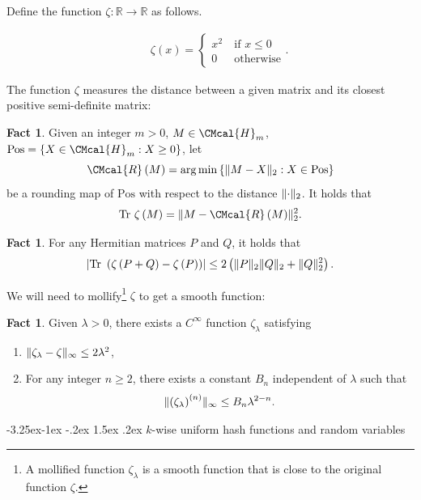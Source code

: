 \documentclass[10pt,a4paper]{article}
\makeatletter
\renewcommand{\subsection}{\@startsection{subsection}{2}{\z@}%
             {-3.25ex\@plus -1ex \@minus -.2ex}%
             {1.5ex \@plus .2ex}%
             {\normalfont\large\scshape\bfseries}}
\def\H{\CMcal{H}}
\def\R{\CMcal{R}}
\theoremstyle{plain}
\theoremstyle{definition}
\newtheorem{fact}[theorem]{Fact}
\newcommand{\reals}{{\mathbb R}}
\newcommand {\set} [1] {\ensuremath{ \left\lbrace #1 \right\rbrace }}
\newcommand {\br} [1] {\ensuremath{ \left( #1 \right) }}
\DeclarePairedDelimiter{\norm}{\lVert}{\rVert}
\newcommand {\normsub} [2] {\ensuremath{ \norm{#1}_{#2} }}
\newcommand {\twonorm} [1] {\normsub{#1}{2}}
\DeclarePairedDelimiter{\abs}{\lvert}{\rvert}
\newcommand {\Tr} {\ensuremath{ \mathrm{Tr} }}
\newcommand{\1}{\mathbb{1}} %
\makeatother
\begin{document}
Define the function $\zeta:\reals\rightarrow\reals$ as follows.

\begin{eqnarray}
	&&\zeta\br{x}=\begin{cases}x^2~&\mbox{if $x\leq 0$}\\ 0~&\mbox{otherwise}\end{cases}.\label{eqn:zeta}
\end{eqnarray}

The function $\zeta$ measures the distance between a given matrix and its closest positive semi-definite matrix:
\begin{fact}\label{lem:closedelta1}\cite[Lemma 9.1]{qin2021nonlocal}
	Given an integer $m>0$, $M\in\H_m$, $\mathrm{Pos}=\set{X\in\H_m:X\geq0}$, let \[\R\br{M}=\arg\min\set{\twonorm{M-X}:X\in\mathrm{Pos}}\]
	 be a rounding map of $\mathrm{Pos}$ with respect to the distance $\twonorm{\cdot}$. It holds that
	\[\Tr~\zeta\br{M}=\twonorm{M-\R\br{M}}^2.\]
\end{fact}

\begin{fact}\label{lem:zetaadditivity}\cite[Lemma 10.4]{qin2021nonlocal}
	For any Hermitian matrices $P$ and $Q$, it holds that \[\abs{\Tr~\br{\zeta\br{P+Q}-\zeta\br{P}}}\leq2\br{\twonorm{P}\twonorm{Q}+\twonorm{Q}^2}.\]
\end{fact}

We will need to mollify\footnote{A mollified function $\zeta_\lambda$ is a smooth function that is close to the original function $\zeta$.}  $\zeta$ to get a smooth function:
\begin{fact}\label{fac:zetalambda}\cite[Lemma 3.21]{mossel2005noise}
Given $\lambda>0$, there exists a $C^\infty$ function $\zeta_\lambda$ satisfying
\begin{enumerate}
\item $\norm{\zeta_\lambda-\zeta}_\infty\leq2\lambda^2$,
\item For any integer $n\geq2$, there exists a constant $B_n$ independent of $\lambda$ such that \[\norm{\br{\zeta_\lambda}^{(n)}}_\infty\leq B_n\lambda^{2-n}.\]
\end{enumerate}
\end{fact}





\subsection{\texorpdfstring{$k$}{k}-wise uniform hash functions and random variables}\label{sec:k-uniform}
\end{document}
